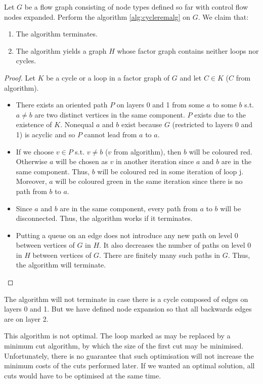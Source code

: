   Let $G$ be a flow graph consisting of node types defined so far with control flow nodes expanded. Perform the algorithm \ref{alg:cycleremalg} on $G$. We claim that:
  \begin{enumerate}
    \item The algorithm terminates.
    \item The algorithm yields a graph $H$ whose factor graph contains neither loops nor cycles.
  \end{enumerate}
  \begin{proof}
    Let $K$ be a cycle or a loop in a factor graph of $G$ and let $C \in K$ ($C$ from algorithm).
    \begin{itemize}
      \item There exists an oriented path $P$ on layers 0 and 1 from some $a$ to some $b$ s.t. $a \neq b$ are two distinct vertices in the same component. $P$ exists due to the existence of $K$. Nonequal $a$ and $b$ exist because $G$ (restricted to layers 0 and 1) is acyclic and so $P$ cannot lead from $a$ to $a$. 
      \item If we choose $v \in P$ s.t. $v \neq b$ ($v$ from algorithm), then $b$ will be coloured red. Otherwise $a$ will be chosen as $v$ in another iteration since $a$ and $b$ are in the same component. Thus, $b$ will be coloured red in some iteration of loop j.  Moreover, $a$ will be coloured green in the same iteration since there is no path from $b$ to $a$.
      \item Since $a$ and $b$ are in the same component, every path from $a$ to $b$ will be disconnected. Thus, the algorithm works if it terminates. 
  \item Putting a queue on an edge does not introduce any new path on level 0 between vertices of $G$ in $H$. It also decreases the number of paths on level 0 in $H$ between vertices of $G$. There are finitely many such paths in $G$. Thus, the algorithm will terminate.
    \end{itemize}
  \end{proof}
\myendclaim

\begin{rem}
  The algorithm will not terminate in case there is a cycle composed of edges on layers 0 and 1. But we have defined node expansion so that all backwards edges are on layer 2.
\end{rem}

This algorithm is not optimal. The loop marked as  may be replaced by a minimum cut algorithm, by which the size of the first cut may be minimised. Unfortunately, there is no guarantee that such optimisation will not increase the minimum costs of the cuts performed later. If we wanted an optimal solution, all cuts would have to be optimised at the same time. 


